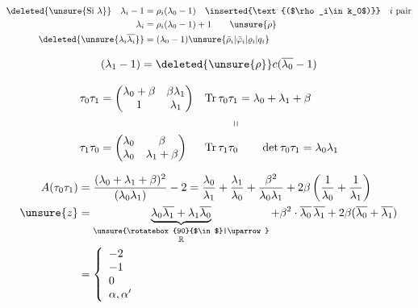 \[
\begin{aligned}
\deleted{\unsure{\text{Si }\lambda}}\quad\lambda_i-1&=\rho_i(\lambda_0-1)
\quad \inserted{\text{($\rho_i\in k_0$)}}\quad i\text{ pair}\\
\lambda_i&=\rho_i(\lambda_0-1)+1\qquad\unsure{\rho}\\
\deleted{\unsure{\lambda_i\overline{\lambda_i}}}&=(\lambda_0-1)\unsure{\bar\rho_i|\bar\varphi_i|\varrho_i|q_i}
\end{aligned}
\]

 

\[
(\lambda_1-1)=\deleted{\unsure{\rho}}c(\overline{\lambda_0}-1)
\]


\[
\begin{aligned}
\tau_0\tau_1&=\begin{pmatrix}\lambda_0+\beta&\beta\lambda_1\\1&\lambda_1\end{pmatrix}
&\operatorname{Tr}\tau_0\tau_1&=\lambda_0+\lambda_1+\beta\\
&&\ \shortparallel&\\
\tau_1\tau_0&=\begin{pmatrix}\lambda_0&\beta\\\lambda_0&\lambda_1+\beta\end{pmatrix}
&\operatorname{Tr}\tau_1\tau_0&\qquad\det\tau_0\tau_1=\lambda_0\lambda_1
\end{aligned}
\]

\[
\begin{aligned}
A(\tau_0\tau_1)
&=\frac{(\lambda_0+\lambda_1+\beta)^2}{(\lambda_0\lambda_1)}-2
=\frac{\lambda_0}{\lambda_1}+\frac{\lambda_1}{\lambda_0}+
\frac{\beta^2}{\lambda_0\lambda_1}+2\beta\left(\frac1{\lambda_0}+\frac1{\lambda_1}\right)\\
\unsure{z}&=\underbrace{\lambda_0\overline{\lambda_1}+\lambda_1\overline{\lambda_0}}_{\substack{\unsure{\rotatebox{90}{$\in$}|\uparrow}\\\mathbb R}}
+\beta^2\cdot\overline{\lambda_0}\,\overline{\lambda_1}
+2\beta(\overline{\lambda_0}+\overline{\lambda_1})\\
&=\left\{\begin{array}{l}-2\\-1\\0\\\alpha,\alpha'\end{array}\right.
\end{aligned}
\]


